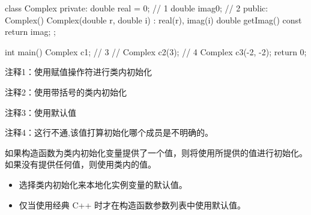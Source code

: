 \begin{cpp}
class Complex {
private:
  double real = 0; // 1
  double imag{0}; // 2
public:
  Complex() {}
  Complex(double r, double i) : real(r), imag(i) {}
  double getImag() const { return imag; }
};

int main() {
  Complex c1; // 3
  // Complex c2(3); // 4
  Complex c3(-2, -2);
  return 0;
}
\end{cpp}

{\footnotesize
注释1：使用赋值操作符进行类内初始化

注释2：使用带括号的类内初始化

注释3：使用默认值

注释4：这行不通,该值打算初始化哪个成员是不明确的。
}

如果构造函数为类内初始化变量提供了一个值，则将使用所提供的值进行初始化。如果没有提供任何值，则使用类内的值。


\begin{itemize}
\item
选择类内初始化来本地化实例变量的默认值。

\item
仅当使用经典 C++ 时才在构造函数参数列表中使用默认值。
\end{itemize}
